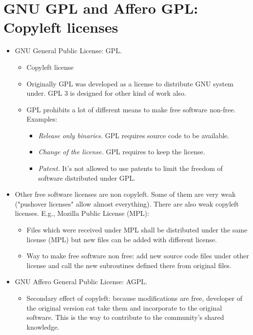 \documentclass[twoside,openright]{report}
\begin{document}
\section{GNU GPL and Affero GPL: Copyleft licenses}
\begin{itemize}
 \item     GNU General Public License: GPL.
\begin{itemize}
 \item         Copyleft license
 \item         Originally GPL was developed as a license to distribute GNU system under. GPL 3 is designed for other kind of work also.
 \item         GPL prohibits a lot of different means to make free software non-free. Examples:
\begin{itemize}
 \item             \emph{Release only binaries.} GPL requires source code to be available.
 \item             \emph{Change of the license.} GPL requires to keep the license.
 \item             \emph{Patent.} It's not allowed to use patents to limit the freedom of software distributed under GPL.
\end{itemize}
\end{itemize}
 \item     Other free software licenses are non copyleft. Some of them are very weak ("pushover licenses" allow almost everything). There are also weak copyleft licenses. E.g., Mozilla Public License (MPL):
\begin{itemize}
 \item         Files which were received under MPL shall be distributed under the same license (MPL) but new files can be added with different license.
 \item         Way to make free software non free: add new source code files under other license and call the new subroutines defined there from original files.
\end{itemize}
 \item     GNU Affero General Public License: AGPL.
\begin{itemize}
 \item         Secondary effect of copyleft: because modifications are free, developer of the original version cat take them and incorporate to the original software. This is the way to contribute to the community's shared knowledge.

\end{itemize}
\end{itemize}
\end{document}
